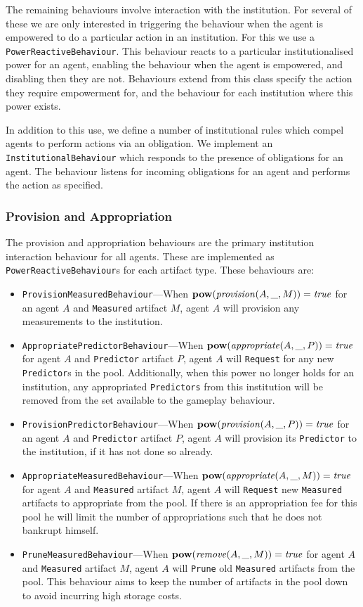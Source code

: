 The remaining behaviours involve interaction with the institution.
For several of these we are only interested in triggering the behaviour when
the agent is empowered to do a particular action in an institution. For this
we use a \texttt{PowerReactiveBehaviour}. This behaviour reacts to a
particular institutionalised power for an agent, enabling the behaviour when
the agent is empowered, and disabling then they are not. Behaviours extend
from this class specify the action they require empowerment for, and the
behaviour for each institution where this power exists.

In addition to this use, we define a number of institutional rules which
compel agents to perform actions via an obligation. We implement an
\texttt{InstitutionalBehaviour} which responds to the presence of obligations
for an agent. The behaviour listens for incoming obligations for an agent and
performs the action as specified. 

\subsubsection*{Provision and Appropriation}

The provision and appropriation behaviours are the primary institution
interaction behaviour for all agents. These are implemented as
\texttt{PowerReactiveBehaviour}s for each artifact type. These behaviours are:

\begin{itemize}
\item \texttt{ProvisionMeasuredBehaviour}---When $\mathbf{pow}(\mathit{provision}(A,\_,M)) = \mathit{true}$ for an agent $A$ and \texttt{Measured} artifact $M$, agent $A$ will provision any measurements to the institution.
\item \texttt{AppropriatePredictorBehaviour}---When $\mathbf{pow}(\mathit{appropriate}(A,\_,P)) = \mathit{true}$ for agent $A$ and \texttt{Predictor} artifact $P$, agent $A$ will \texttt{Request} for any new \texttt{Predictor}s in the pool. Additionally, when this power no longer holds for an institution, any appropriated \texttt{Predictors} from this institution will be removed from the set available to the gameplay behaviour.
\item \texttt{ProvisionPredictorBehaviour}---When $\mathbf{pow}(\mathit{provision}(A,\_,P)) = \mathit{true}$ for an agent $A$ and \texttt{Predictor} artifact $P$, agent $A$ will provision its \texttt{Predictor} to the institution, if it has not done so already.
\item \texttt{AppropriateMeasuredBehaviour}---When $\mathbf{pow}(\mathit{appropriate}(A,\_,M)) = \mathit{true}$ for agent $A$ and \texttt{Measured} artifact $M$, agent $A$ will \texttt{Request} new \texttt{Measured} artifacts to appropriate from the pool. If there is an appropriation fee for this pool he will limit the number of appropriations such that he does not bankrupt himself.
\item \texttt{PruneMeasuredBehaviour}---When $\mathbf{pow}(\mathit{remove}(A,\_,M)) = \mathit{true}$ for agent $A$ and \texttt{Measured} artifact $M$, agent $A$ will \texttt{Prune} old \texttt{Measured} artifacts from the pool. This behaviour aims to keep the number of artifacts in the pool down to avoid incurring high storage costs.
\end{itemize}

